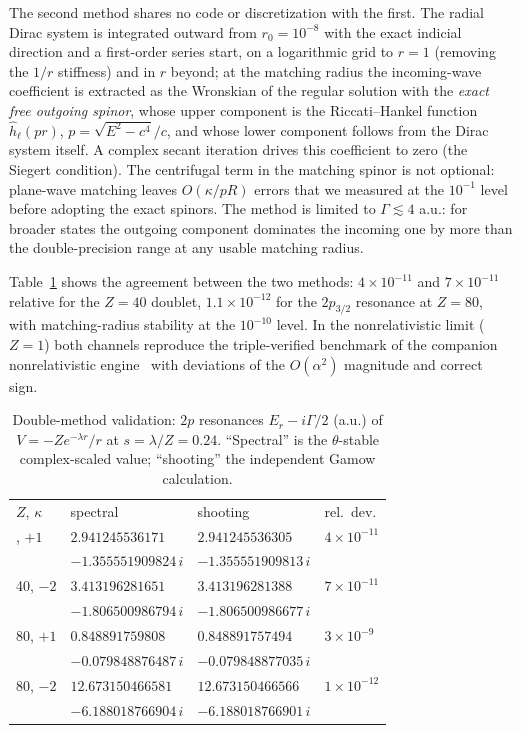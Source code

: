 \documentclass[aps,pra,twocolumn,superscriptaddress,floatfix,longbibliography]{revtex4-2}
\begin{document}
The second method shares no code or discretization with the first. The
radial Dirac system is integrated outward from $r_{0}=10^{-8}$ with the
exact indicial direction and a first-order series start, on a
logarithmic grid to $r=1$ (removing the $1/r$ stiffness) and in $r$
beyond; at the matching radius the incoming-wave coefficient is
extracted as the Wronskian of the regular solution with the \emph{exact
free outgoing spinor}, whose upper component is the Riccati--Hankel
function $\hat h_{\ell}(pr)$, $p=\sqrt{E^{2}-c^{4}}/c$, and whose lower
component follows from the Dirac system itself. A complex secant
iteration drives this coefficient to zero (the Siegert condition). The
centrifugal term in the matching spinor is not optional: plane-wave
matching leaves $O(\kappa/pR)$ errors that we measured at the
$10^{-1}$ level before adopting the exact spinors. The method is
limited to $\Gamma\lesssim4$ a.u.: for broader states the outgoing
component dominates the incoming one by more than the double-precision
range at any usable matching radius.

Table~\ref{tab:double} shows the agreement between the two methods:
$4\times10^{-11}$ and $7\times10^{-11}$ relative for the $Z=40$
doublet, $1.1\times10^{-12}$ for the $2p_{3/2}$ resonance at $Z=80$,
with matching-radius stability at the $10^{-10}$ level. In the
nonrelativistic limit ($Z=1$) both channels reproduce the
triple-verified benchmark of the companion nonrelativistic
engine~\cite{companionA} with deviations of the $O(\alpha^{2})$
magnitude and correct sign.

\begin{table}[t]
\caption{Double-method validation: $2p$ resonances $E_{r}-i\Gamma/2$
(a.u.) of $V=-Ze^{-\lambda r}/r$ at $s=\lambda/Z=0.24$. ``Spectral'' is
the $\theta$-stable complex-scaled value; ``shooting'' the independent
Gamow calculation. }
\label{tab:double}
\begin{ruledtabular}
\begin{tabular}{llll}
$Z$, $\kappa$ & spectral & shooting & rel.\ dev.\\
\colrule
40, $+1$ & $2.941245536171$ & $2.941245536305$ & $4\times10^{-11}$\\
         & $-1.355551909824\,i$ & $-1.355551909813\,i$ & \\
40, $-2$ & $3.413196281651$ & $3.413196281388$ & $7\times10^{-11}$\\
         & $-1.806500986794\,i$ & $-1.806500986677\,i$ & \\
80, $+1$ & $0.848891759808$ & $0.848891757494$ & $3\times10^{-9}$\\
         & $-0.079848876487\,i$ & $-0.079848877035\,i$ & \\
80, $-2$ & $12.673150466581$ & $12.673150466566$ & $1\times10^{-12}$\\
         & $-6.188018766904\,i$ & $-6.188018766901\,i$ & \\
\end{tabular}
\end{ruledtabular}
\end{table}
\end{document}
